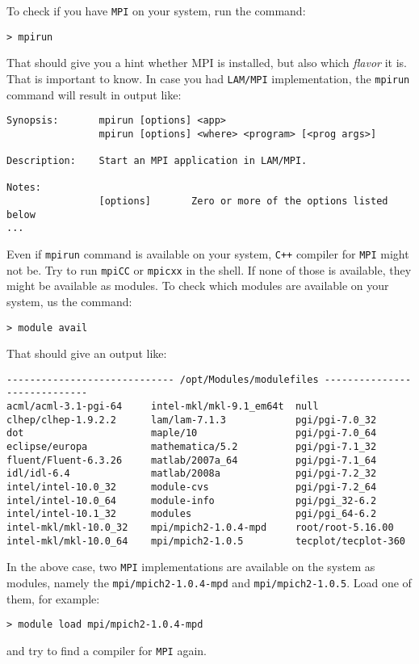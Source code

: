 To check if you have {\tt MPI} on your system, run the command:
%
\begin{verbatim}
> mpirun
\end{verbatim}
%
That should give you a hint whether MPI is installed, but also which {\em flavor}
it is. That is important to know. In case you had {\tt LAM/MPI} implementation,
the {\tt mpirun} command will result in output like:
%
{\small \begin{verbatim}
Synopsis:       mpirun [options] <app>
                mpirun [options] <where> <program> [<prog args>]

Description:    Start an MPI application in LAM/MPI.

Notes:
                [options]       Zero or more of the options listed below
...
\end{verbatim}}
%
Even if {\tt mpirun} command is available on your system, {\tt C++} compiler
for {\tt MPI} might not be. Try to run {\tt mpiCC} or {\tt mpicxx} in the shell.
%
If none of those is available, they might be available as modules. To check 
which modules are available on your system, us the command:
%
\begin{verbatim}
> module avail
\end{verbatim}
%
That should give an output like:
%
{\small \begin{verbatim}
----------------------------- /opt/Modules/modulefiles -----------------------------
acml/acml-3.1-pgi-64     intel-mkl/mkl-9.1_em64t  null
clhep/clhep-1.9.2.2      lam/lam-7.1.3            pgi/pgi-7.0_32
dot                      maple/10                 pgi/pgi-7.0_64
eclipse/europa           mathematica/5.2          pgi/pgi-7.1_32
fluent/Fluent-6.3.26     matlab/2007a_64          pgi/pgi-7.1_64
idl/idl-6.4              matlab/2008a             pgi/pgi-7.2_32
intel/intel-10.0_32      module-cvs               pgi/pgi-7.2_64
intel/intel-10.0_64      module-info              pgi/pgi_32-6.2
intel/intel-10.1_32      modules                  pgi/pgi_64-6.2
intel-mkl/mkl-10.0_32    mpi/mpich2-1.0.4-mpd     root/root-5.16.00
intel-mkl/mkl-10.0_64    mpi/mpich2-1.0.5         tecplot/tecplot-360
\end{verbatim}}
%
In the above case, two {\tt MPI} implementations are available on the system as modules,
namely the {\tt mpi/mpich2-1.0.4-mpd} and {\tt mpi/mpich2-1.0.5}. Load one of them,
for example:
%
\begin{verbatim}
> module load mpi/mpich2-1.0.4-mpd
\end{verbatim}
%
and try to find a compiler for {\tt MPI} again. 

